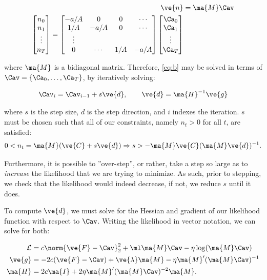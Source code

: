 \documentclass[12pt]{article}
\begin{document}
\begin{align}
\ve{n} &= \ma{M} \Cav \nonumber \\
\begin{bmatrix} n_0 \\ n_1 \\ \vdots \\ n_T \end{bmatrix}
= \begin{bmatrix} -a/A & 0 & 0 & \cdots \\ 1/A & -a/A & 0 & \cdots \\ \vdots \\ 0 & \cdots & 1/A & -a/A  \end{bmatrix}
\begin{bmatrix} \Ca_0 \\ \Ca_1 \\ \vdots \\ \Ca_T \end{bmatrix}
\end{align} 

\noindent where $\ma{M}$ is a bidiagonal matrix.  Therefore, \eqref{eq:b} may be solved in terms of $\Cav=\{\Ca_0, \ldots, \Ca_T\}$, by iteratively solving:

\begin{align} \label{eq:newton}
\Cav_i = \Cav_{i-1} + s \ve{d}, \qquad \ve{d}=\ma{H}^{-1}\ve{g} 
\end{align}

\noindent where $s$ is the step size, $d$ is the step direction, and $i$ indexes the iteration.  $s$ must be chosen such that all of our constraints, namely $n_t>0$ for all $t$, are satisfied:\begin{align}
0< n_t =  \ma{M}(\ve{C} + s \ve{d})
\Rightarrow s > -\ma{M}\ve{C} (\ma{M} \ve{d})^{-1}. \label{eq:s}
\end{align}

Furthermore, it is possible to ''over-step'', or rather, take a step so large as to \emph{increase} the likelihood that we are trying to minimize.  As such, prior to stepping, we check that the likelihood would indeed decrease, if not, we reduce $s$ until it does. 

To compute $\ve{d}$, we must solve for the Hessian and gradient of our likelihood function with respect to $\Cav$.  Writing the likelihood in vector notation, we can solve for both: 

\begin{align}
\mathcal{L} &= c \norm{\ve{F}-\Cav}_2^2 +\ml \ma{M}\Cav - \eta \log (\ma{M}\Cav)\\
\ve{g} &=-2c(\ve{F}-\Cav)+\ve{\lambda}\ma{M} - \eta \ma{M}' (\ma{M}\Cav)^{-1} \label{eq:bar_g}\\
\ma{H} &=2c\ma{I} + 2 \eta \ma{M}' (\ma{M}\Cav)^{-2}\ma{M} \label{eq:bar_H}.
\end{align}
\end{document}

